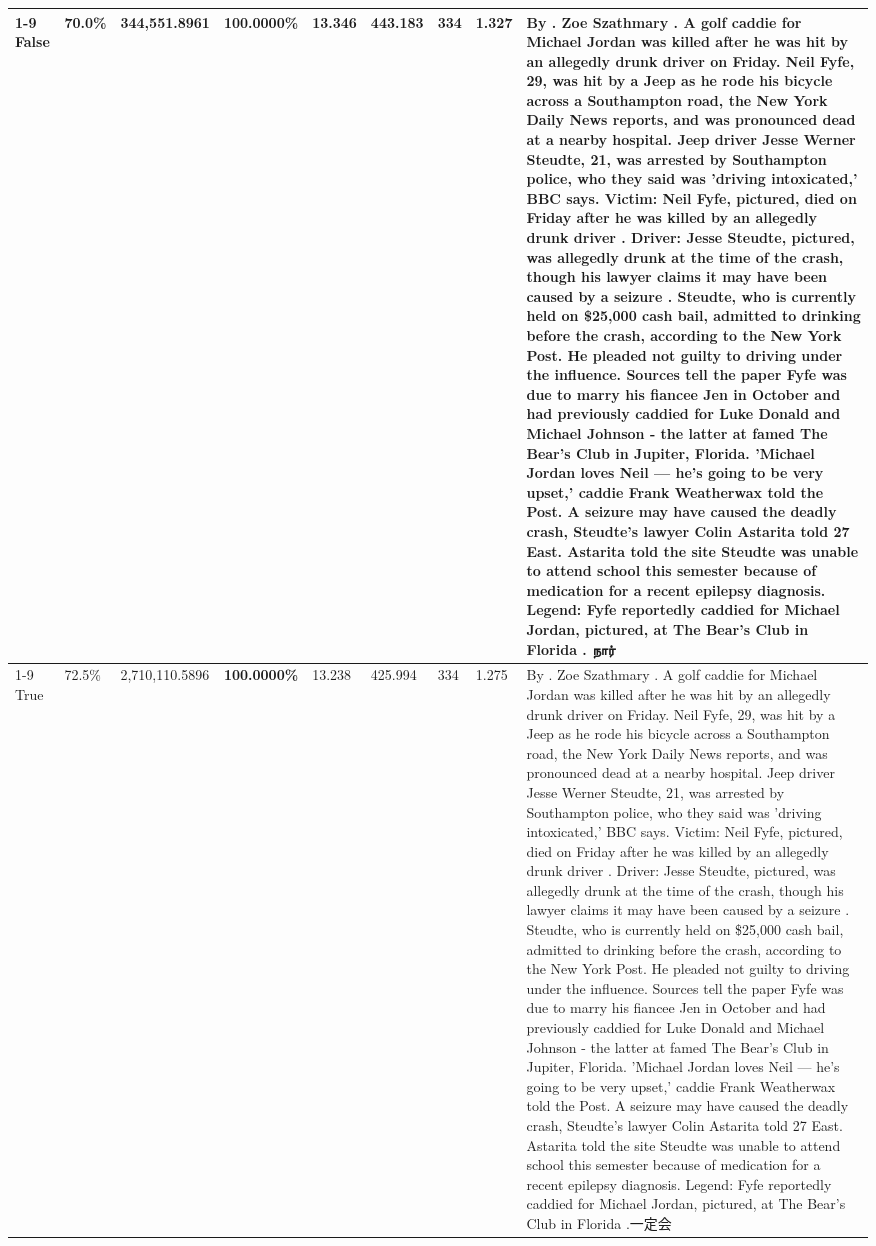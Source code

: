 \begin{table}[H]
\begin{tabular}{lllrlllll}
\cline{1-9}
False & 70.0\% & 344,551.8961 & \bfseries \color{red} 100.0000\% & 13.346 & 443.183 & 334 & 1.327 & By . Zoe Szathmary . A golf caddie for Michael Jordan was killed after he was hit by an allegedly drunk driver on Friday. Neil Fyfe, 29, was hit by a Jeep as he rode his bicycle across a Southampton road, the New York Daily News reports, and was pronounced dead at a nearby hospital. Jeep driver Jesse Werner Steudte, 21, was arrested by Southampton police, who they said was 'driving intoxicated,' BBC says. Victim: Neil Fyfe, pictured, died on Friday after he was killed by an allegedly drunk driver . Driver: Jesse Steudte, pictured, was allegedly drunk at the time of the crash, though his lawyer claims it may have been caused by a seizure . Steudte, who is currently held on \$25,000 cash bail, admitted to drinking before the crash, according to the New York Post. He pleaded not guilty to driving under the influence. Sources tell the paper Fyfe was due to marry his fiancee Jen in October and had previously caddied for Luke Donald and Michael Johnson - the latter at famed The Bear's Club in Jupiter, Florida. 'Michael Jordan loves Neil — he’s going to be very upset,' caddie Frank Weatherwax told the Post. A seizure may have caused the deadly crash, Steudte's lawyer Colin Astarita told 27 East. Astarita told the site Steudte was unable to attend school this semester because of medication for a recent epilepsy diagnosis. Legend: Fyfe reportedly caddied for Michael Jordan, pictured, at The Bear's Club in Florida . நார் \\
\cline{1-9}
True & 72.5\% & 2,710,110.5896 & \bfseries \color{red} 100.0000\% & 13.238 & 425.994 & 334 & 1.275 & By . Zoe Szathmary . A golf caddie for Michael Jordan was killed after he was hit by an allegedly drunk driver on Friday. Neil Fyfe, 29, was hit by a Jeep as he rode his bicycle across a Southampton road, the New York Daily News reports, and was pronounced dead at a nearby hospital. Jeep driver Jesse Werner Steudte, 21, was arrested by Southampton police, who they said was 'driving intoxicated,' BBC says. Victim: Neil Fyfe, pictured, died on Friday after he was killed by an allegedly drunk driver . Driver: Jesse Steudte, pictured, was allegedly drunk at the time of the crash, though his lawyer claims it may have been caused by a seizure . Steudte, who is currently held on \$25,000 cash bail, admitted to drinking before the crash, according to the New York Post. He pleaded not guilty to driving under the influence. Sources tell the paper Fyfe was due to marry his fiancee Jen in October and had previously caddied for Luke Donald and Michael Johnson - the latter at famed The Bear's Club in Jupiter, Florida. 'Michael Jordan loves Neil — he’s going to be very upset,' caddie Frank Weatherwax told the Post. A seizure may have caused the deadly crash, Steudte's lawyer Colin Astarita told 27 East. Astarita told the site Steudte was unable to attend school this semester because of medication for a recent epilepsy diagnosis. Legend: Fyfe reportedly caddied for Michael Jordan, pictured, at The Bear's Club in Florida .一定会 \\

\end{tabular}
\end{table}
